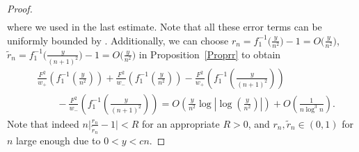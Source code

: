 \begin{proof}
\begin{align*}
\end{align*}
where we used \cite[Lemma~6.4]{KMVV} in the last estimate. Note that all these error terms can be uniformly bounded by . Additionally, we can choose $r_n = f_1^{-1}\big(\frac{y}{n^2}\big)-1 = O\big( \frac{y}{n^2}\big)$, $\tilde r_n = f_1^{-1}\big(\frac{y}{(n+1)^2}\big)-1 = O\big( \frac{y}{n^2}\big)$ in Proposition~\ref{Proprr} to obtain
\begin{align*}
 &\frac{F^2}{w_+}\left(f_1^{-1}\left(\frac{y}{n^2}\right)\right)+\frac{F^2}{w_-}\left(f_1^{-1}\left(\frac{y}{n^2}\right)\right) - \frac{F^2}{w_+}\left(f_1^{-1}\left(\frac{y}{(n+1)^2}\right)\right)
 \\
 &\qquad{}-\frac{F^2}{w_-}\left(f_1^{-1}\left(\frac{y}{(n+1)^2}\right)\right) = O\left(\frac{y}{n^2}\log \left| \log \left( \frac{y}{n^2} \right)\right| \right)+O\left(\frac{1}{n\log^3 n}\right).
\end{align*}
Note that indeed $n \big|\frac{r_n}{\tilde r_n} - 1\big| < R$ for an appropriate $R > 0$, and $r_n, \tilde r_n \in (0,1)$ for $n$ large enough due to $0 < y < cn$.


\end{proof}
